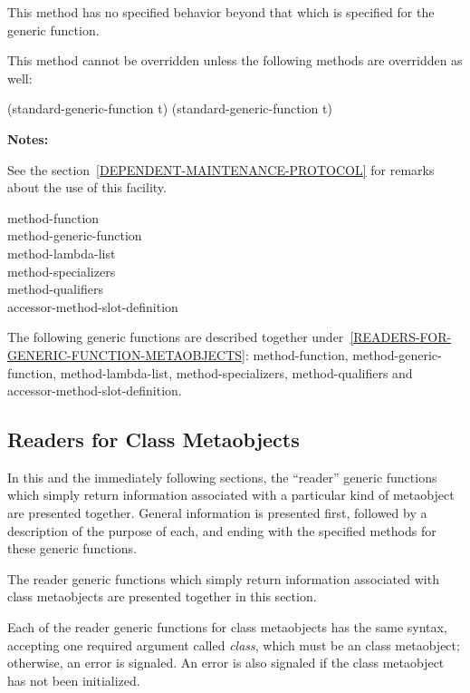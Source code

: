 \begin{defun}
\begin{defun}
This method has no specified behavior beyond that which is specified for the generic function.

This method cannot be overridden unless the following methods are overridden as well:

     (standard-generic-function t)
     (standard-generic-function t) 
\end{defun}

\textbf{Notes:}

See the section~\ref{DEPENDENT-MAINTENANCE-PROTOCOL} for remarks about the use
of this facility.
\end{defun}

\begin{defun}
method-function \\
method-generic-function \\
method-lambda-list \\
method-specializers \\
method-qualifiers \\
accessor-method-slot-definition

The following generic functions are described together
under~\ref{READERS-FOR-GENERIC-FUNCTION-METAOBJECTS}: method-function,
method-generic-function, method-lambda-list, method-specializers,
method-qualifiers and accessor-method-slot-definition.
\end{defun}

\subsection{Readers for Class Metaobjects}
\label{READERS-FOR-CLASS-METAOBJECTS}
       
In this and the immediately following sections, the ``reader'' generic functions
which simply return information associated with a particular kind of metaobject
are presented together. General information is presented first, followed by a
description of the purpose of each, and ending with the specified methods for
these generic functions.

The reader generic functions which simply return information associated with
class metaobjects are presented together in this section.

Each of the reader generic functions for class metaobjects has the same syntax,
accepting one required argument called \emph{class}, which must be an class
metaobject; otherwise, an error is signaled. An error is also signaled if the
class metaobject has not been initialized.

